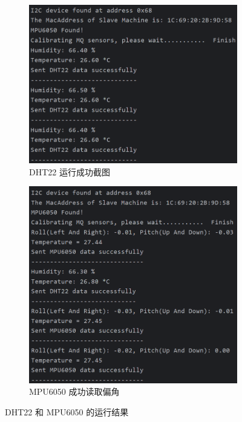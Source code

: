 \begin{figure}[H]
    \centering
    \begin{subfigure}[b]{0.4\textwidth}
        \centering
        \includegraphics[width=\textwidth]{img/DHT22_active.png}
        \caption{DHT22 运行成功截图}
        \label{fig:DHT22_active}
    \end{subfigure}
    \hspace{4em}
    \begin{subfigure}[b]{0.325\textwidth}
        \centering
        \includegraphics[width=\textwidth]{img/MPU6050_active.png}
        \caption{MPU6050 成功读取偏角}
        \label{fig:MPU6050_active}
    \end{subfigure}
    \caption{DHT22 和 MPU6050 的运行结果}
    \label{fig:combined}
\end{figure}


